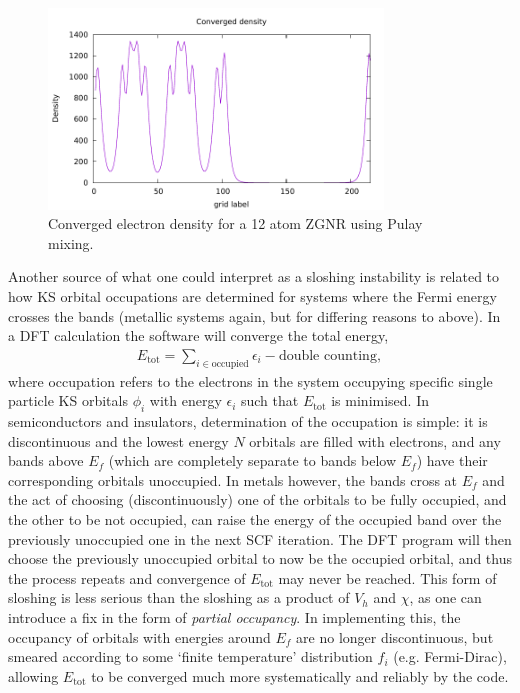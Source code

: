 \begin{figure}
\centering
\includegraphics[width=3.5in]{Pictures/pulay_converged.pdf}
\caption{Converged electron density for a 12 atom ZGNR using Pulay mixing.}
\label{sloshing2}
\end{figure}



Another source of what one could interpret as a sloshing instability is related to how KS orbital occupations are determined for systems where the Fermi energy crosses the bands (metallic systems again, but for differing reasons to above). In a DFT calculation the software will converge the total energy,
\begin{gather}
E_{\text{tot}} = \sum_{i \in \text{occupied}} \epsilon_i - \text{double counting},
\end{gather}
where occupation refers to the electrons in the system occupying specific single particle KS orbitals $\phi_i$ with energy $\epsilon_i$ such that $E_{\text{tot}}$ is minimised. In semiconductors and insulators, determination of the occupation is simple: it is discontinuous and the lowest energy $N$ orbitals are filled with electrons, and any bands above $E_f$ (which are completely separate to bands below $E_f$) have their corresponding orbitals unoccupied. In metals however, the bands cross at $E_f$ and the act of choosing (discontinuously) one of the orbitals to be fully occupied, and the other to be not occupied, can raise the energy of the occupied band over the previously unoccupied one in the next SCF iteration. The DFT program will then choose the previously unoccupied orbital to now be the occupied orbital, and thus the process repeats and convergence of $E_{\text{tot}}$ may never be reached. This form of sloshing is less serious than the sloshing as a product of $V_h$ and $\chi$, as one can introduce a fix in the form of \textit{partial occupancy}. In implementing this, the occupancy of orbitals with energies around $E_f$ are no longer discontinuous, but smeared according to some `finite temperature' distribution $f_i$ (e.g. Fermi-Dirac), allowing $E_{\text{tot}}$ to be converged much more systematically and reliably by the code. 

